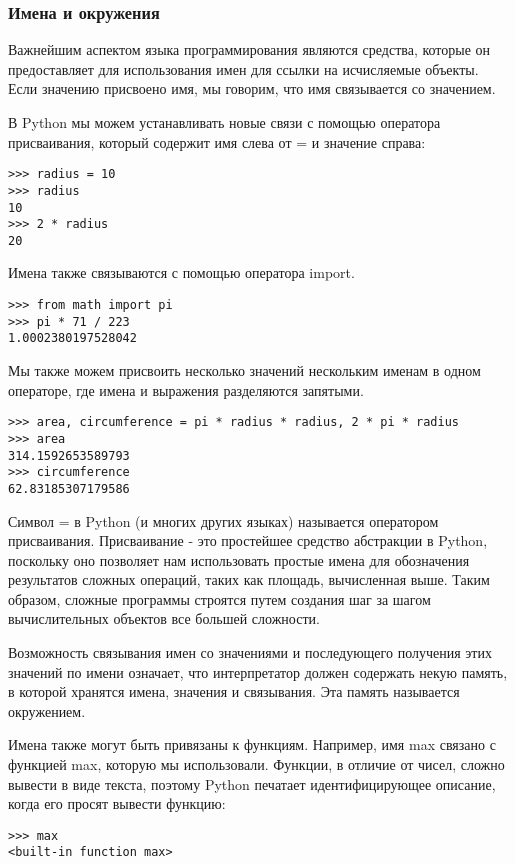 \subsubsection{Имена и окружения}
Важнейшим аспектом языка программирования являются средства, которые он предоставляет для использования имен для ссылки на исчисляемые объекты. Если значению присвоено имя, мы говорим, что имя связывается со значением.

В Python мы можем устанавливать новые связи с помощью оператора присваивания, который содержит имя слева от = и значение справа:
\begin{verbatim}
>>> radius = 10
>>> radius
10
>>> 2 * radius
20
  \end{verbatim}

Имена также связываются с помощью оператора import.
\begin{verbatim}
>>> from math import pi
>>> pi * 71 / 223
1.0002380197528042
  \end{verbatim}

Мы также можем присвоить несколько значений нескольким именам в одном операторе, где имена и выражения разделяются запятыми.
\begin{verbatim}
>>> area, circumference = pi * radius * radius, 2 * pi * radius
>>> area
314.1592653589793
>>> circumference
62.83185307179586
  \end{verbatim}

Символ = в Python (и многих других языках) называется оператором присваивания. Присваивание - это простейшее средство абстракции в Python, поскольку оно позволяет нам использовать простые имена для обозначения результатов сложных операций, таких как площадь, вычисленная выше. Таким образом, сложные программы строятся путем создания шаг за шагом вычислительных объектов все большей сложности.

Возможность связывания имен со значениями и последующего получения этих значений по имени означает, что интерпретатор должен содержать некую память, в которой хранятся имена, значения и связывания. Эта память называется окружением.

Имена также могут быть привязаны к функциям. Например, имя max связано с функцией max, которую мы использовали. Функции, в отличие от чисел, сложно вывести в виде текста, поэтому Python печатает идентифицирующее описание, когда его просят вывести функцию:
\begin{verbatim}
>>> max
<built-in function max>
  \end{verbatim}

